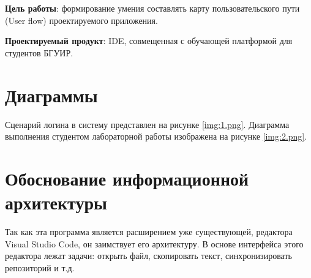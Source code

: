 \documentclass{bsuir}
\begin{document}
\maketitle
\mainmatter

\textbf{Цель работы}: формирование умения составлять карту пользовательского пути (User flow) проектируемого приложения.

\textbf{Проектируемый продукт}: IDE, совмещенная с обучающей платформой для студентов БГУИР.

\section{Диаграммы}

Сценарий логина в систему представлен на рисунке \ref{img:1.png}. Диаграмма выполнения студентом лабораторной работы
изображена на рисунке \ref{img:2.png}.



\section{Обоснование информационной архитектуры}

Так как эта программа является расширением уже существующей, редактора Visual Studio Code, он заимствует его
архитектуру. В основе интерфейса этого редактора лежат задачи: открыть файл, скопировать текст, синхронизировать
репозиторий и т.д.
\end{document}
